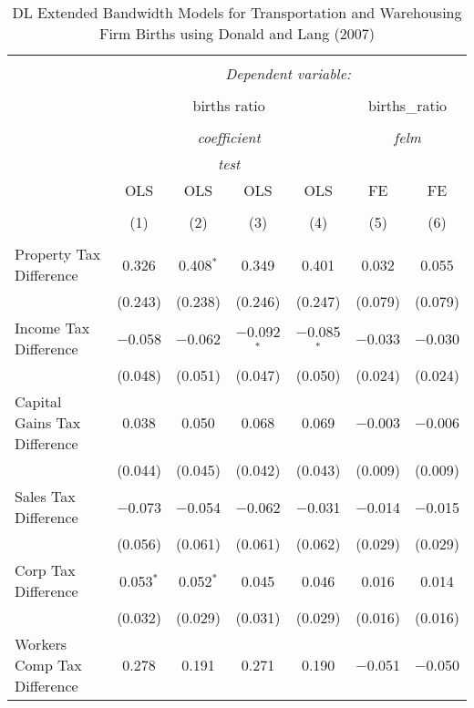 
\begin{table}[!htbp] \centering 
  \caption{DL Extended Bandwidth Models for  Transportation and Warehousing Firm Births using Donald and Lang (2007)} 
  \label{} 
\begin{tabular}{@{\extracolsep{5pt}}lcccccc} 
\\[-1.8ex]\hline 
\hline \\[-1.8ex] 
 & \multicolumn{6}{c}{\textit{Dependent variable:}} \\ 
\cline{2-7} 
\\[-1.8ex] & \multicolumn{4}{c}{births ratio} & \multicolumn{2}{c}{births\_ratio} \\ 
\\[-1.8ex] & \multicolumn{4}{c}{\textit{coefficient}} & \multicolumn{2}{c}{\textit{felm}} \\ 
 & \multicolumn{4}{c}{\textit{test}} & \multicolumn{2}{c}{\textit{}} \\ 
 & OLS & OLS & OLS & OLS & FE & FE \\ 
\\[-1.8ex] & (1) & (2) & (3) & (4) & (5) & (6)\\ 
\hline \\[-1.8ex] 
 Property Tax Difference & 0.326 & 0.408$^{*}$ & 0.349 & 0.401 & 0.032 & 0.055 \\ 
  & (0.243) & (0.238) & (0.246) & (0.247) & (0.079) & (0.079) \\ 
  Income Tax Difference & $-$0.058 & $-$0.062 & $-$0.092$^{*}$ & $-$0.085$^{*}$ & $-$0.033 & $-$0.030 \\ 
  & (0.048) & (0.051) & (0.047) & (0.050) & (0.024) & (0.024) \\ 
  Capital Gains Tax Difference & 0.038 & 0.050 & 0.068 & 0.069 & $-$0.003 & $-$0.006 \\ 
  & (0.044) & (0.045) & (0.042) & (0.043) & (0.009) & (0.009) \\ 
  Sales Tax Difference & $-$0.073 & $-$0.054 & $-$0.062 & $-$0.031 & $-$0.014 & $-$0.015 \\ 
  & (0.056) & (0.061) & (0.061) & (0.062) & (0.029) & (0.029) \\ 
  Corp Tax Difference & 0.053$^{*}$ & 0.052$^{*}$ & 0.045 & 0.046 & 0.016 & 0.014 \\ 
  & (0.032) & (0.029) & (0.031) & (0.029) & (0.016) & (0.016) \\ 
  Workers Comp Tax Difference & 0.278 & 0.191 & 0.271 & 0.190 & $-$0.051 & $-$0.050 \\ 

\end{tabular}
\end{table}
